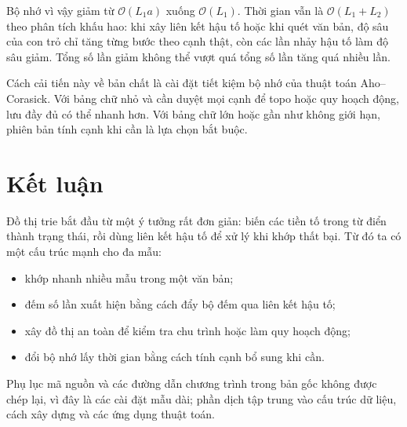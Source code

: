 \documentclass[11pt]{article}
\newcommand{\Oh}{\mathcal{O}}
\begin{document}
Bộ nhớ vì vậy giảm từ \(\Oh(L_1a)\) xuống \(\Oh(L_1)\). Thời gian vẫn là
\(\Oh(L_1+L_2)\) theo phân tích khấu hao: khi xây liên kết hậu tố hoặc khi
quét văn bản, độ sâu của con trỏ chỉ tăng từng bước theo cạnh thật, còn các
lần nhảy hậu tố làm độ sâu giảm. Tổng số lần giảm không thể vượt quá tổng số
lần tăng quá nhiều lần.

Cách cải tiến này về bản chất là cài đặt tiết kiệm bộ nhớ của thuật toán
Aho--Corasick. Với bảng chữ nhỏ và cần duyệt mọi cạnh để topo hoặc quy hoạch
động, lưu đầy đủ có thể nhanh hơn. Với bảng chữ lớn hoặc gần như không giới
hạn, phiên bản tính cạnh khi cần là lựa chọn bắt buộc.

\section{Kết luận}

Đồ thị trie bắt đầu từ một ý tưởng rất đơn giản: biến các tiền tố trong từ
điển thành trạng thái, rồi dùng liên kết hậu tố để xử lý khi khớp thất bại.
Từ đó ta có một cấu trúc mạnh cho đa mẫu:
\begin{itemize}
  \item khớp nhanh nhiều mẫu trong một văn bản;
  \item đếm số lần xuất hiện bằng cách đẩy bộ đếm qua liên kết hậu tố;
  \item xây đồ thị an toàn để kiểm tra chu trình hoặc làm quy hoạch động;
  \item đổi bộ nhớ lấy thời gian bằng cách tính cạnh bổ sung khi cần.
\end{itemize}

Phụ lục mã nguồn và các đường dẫn chương trình trong bản gốc không được chép
lại, vì đây là các cài đặt mẫu dài; phần dịch tập trung vào cấu trúc dữ liệu,
cách xây dựng và các ứng dụng thuật toán.
\end{document}
